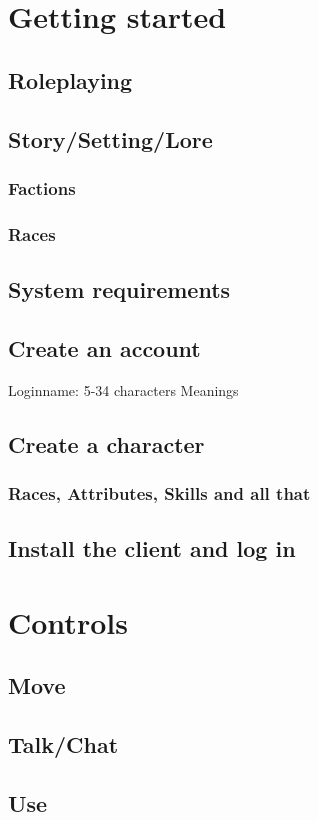 \documentclass[a4paper,11pt]{scrreprt}
\begin{document}
\chapter{Getting started}
\section{Roleplaying}
\section{Story/Setting/Lore}
\subsection{Factions}
\subsection{Races}
\section{System requirements}
\section{Create an account}
Loginname: 5-34 characters
Meanings
\section{Create a character}
\subsection{Races, Attributes, Skills and all that}
\section{Install the client and log in}

\chapter{Controls}
\section{Move}
\section{Talk/Chat}
\section{Use}
\end{document}
